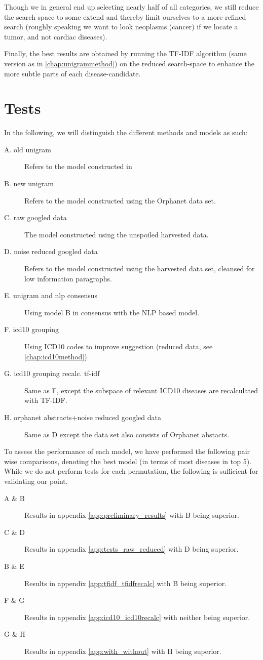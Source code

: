 \documentclass[10pt,letterpaper,final]{article}
\begin{document}
Though we in general end up selecting nearly half of all categories, we
still reduce the search-space to some extend and thereby limit ourselves
to a more refined search (roughly speaking we want to look neoplasms
(cancer) if we locate a tumor, and not cardiac diseases).

Finally, the best results are obtained by running the TF-IDF algorithm
(same version as in \ref{chap:unigrammethod}) on the reduced
search-space to enhance the more subtle parts of each disease-candidate.

\section{Tests}
\label{chap:test}
In the following, we will distinguish the different methods and models
as such:
\begin{description}
\item[A. old unigram] Refers to the model constructed in
\cite{jensenandersen}
\item[B. new unigram] Refers to the model constructed using the Orphanet data
set.
\item[C. raw googled data] The model constructed using the unspoiled harvested data.
\item[D. noise reduced googled data] Refers to the model constructed using the
harvested data set, cleansed for low information paragraphs.
\item[E. unigram and nlp consensus] Using model B in consensus with the NLP based model.
\item[F. icd10 grouping] Using ICD10 codes to improve suggestion (reduced data, see \ref{chap:icd10method})
\item[G. icd10 grouping recalc. tf-idf] Same as F, except the subspace
of relevant ICD10 diseases are recalculated with TF-IDF.
\item[H. orphanet abstracts+noise reduced googled data] Same as D except
the data set also consists of Orphanet abstacts.
\end{description}

To assess the performance of each model, we have performed the following
pair wise comparisons, denoting the best model (in terms of most
diseases in top 5). While we do not perform tests for each permutation,
the following is sufficient for validating our point.
\begin{description}
\item[A \& B] Results in appendix \ref{app:preliminary_results} with B being superior.
\item[C \& D] Results in appendix \ref{app:tests_raw_reduced} with D being superior.
\item[B \& E] Results in appendix \ref{app:tfidf_tfidfrecalc} with B being superior.
\item[F \& G] Results in appendix \ref{app:icd10_icd10recalc} with neither being superior.
\item[G \& H] Results in appendix \ref{app:with_without} with H being superior.
\end{description}
\end{document}
